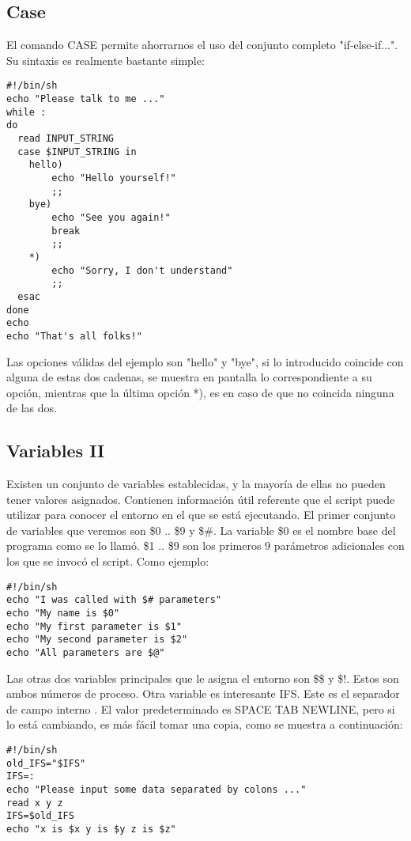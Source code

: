 \documentclass{article}
\begin{document}
\begin{itemize}
\subsection*{Case}
El comando CASE permite ahorrarnos el uso del conjunto completo "if-else-if...". Su sintaxis es realmente bastante simple:
\begin{verbatim}
#!/bin/sh
echo "Please talk to me ..."
while :
do
  read INPUT_STRING
  case $INPUT_STRING in
	hello)
		echo "Hello yourself!"
		;;
	bye)
		echo "See you again!"
		break
		;;
	*)
		echo "Sorry, I don't understand"
		;;
  esac
done
echo
echo "That's all folks!"
\end{verbatim}
Las opciones válidas del ejemplo son "hello" y "bye", si lo introducido coincide con alguna de estas dos cadenas, se muestra en pantalla lo correspondiente a su opción, mientras que la última opción *), es en caso de que no coincida ninguna de las dos.

\subsection*{Variables II}
Existen un conjunto de variables establecidas, y la mayoría de ellas no pueden tener valores asignados. Contienen información útil referente que el script puede utilizar para conocer el entorno en el que se está ejecutando. El primer conjunto de variables que veremos son \$0 .. \$9 y \$\#. La variable \$0 es el nombre base del programa como se lo llamó. \$1 .. \$9 son los primeros 9 parámetros adicionales con los que se invocó el script. Como ejemplo:
\begin{verbatim}
#!/bin/sh
echo "I was called with $# parameters"
echo "My name is $0"
echo "My first parameter is $1"
echo "My second parameter is $2"
echo "All parameters are $@"
\end{verbatim}
Las otras dos variables principales que le asigna el entorno son \$\$ y \$!. Estos son ambos números de proceso. Otra variable es interesante IFS. Este es el separador de campo interno . El valor predeterminado es SPACE TAB NEWLINE, pero si lo está cambiando, es más fácil tomar una copia, como se muestra a continuación:
\begin{verbatim}
#!/bin/sh
old_IFS="$IFS"
IFS=:
echo "Please input some data separated by colons ..."
read x y z
IFS=$old_IFS
echo "x is $x y is $y z is $z"
\end{verbatim}


\end{itemize}
\end{document}
